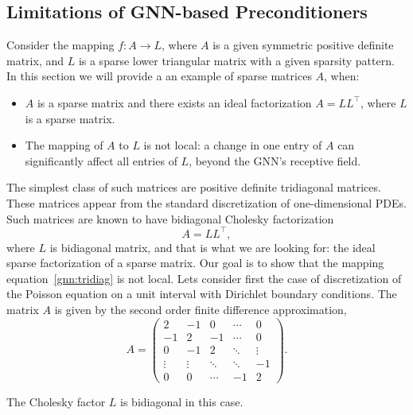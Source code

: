 \documentclass[10pt]{article} %
\def\eqref#1{equation~\ref{#1}}
\theoremstyle{plain}
\theoremstyle{definition}
\theoremstyle{remark}
\begin{document}
\subsection{Limitations of GNN-based Preconditioners}
Consider the mapping $f: A \rightarrow L$, where $A$ is a given symmetric positive definite matrix, and $L$ is a sparse lower triangular matrix with
a given sparsity pattern. In this section we will provide a an example of sparse matrices $A$, when: 
\begin{itemize}
\item $A$ is a sparse matrix and 
there exists an ideal factorization $A = L L^{\top}$, where $L$ is a sparse matrix.
\item The mapping of $A$ to $L$ is not local: a change in one entry of $A$ can significantly affect all entries of $L$, beyond the GNN's receptive field.
\end{itemize}
The simplest class of such matrices are positive definite tridiagonal matrices. These matrices appear from the standard discretization of 
one-dimensional PDEs. Such matrices are known to have bidiagonal Cholesky factorization 
\begin{equation}\label{gnn:tridiag}
   A = LL^{\top},
\end{equation}
where $L$ is bidiagonal matrix,
and that is what we are looking for: the ideal sparse factorization of a sparse matrix. Our goal is to show that the mapping \eqref{gnn:tridiag} is not local. Lets consider first the case of discretization of the Poisson equation 
on a unit interval with Dirichlet boundary conditions. The matrix $A$ is given by the second order finite difference approximation,
\begin{equation}
A = \begin{pmatrix}
2 & -1 & 0 & \cdots & 0 \\
-1 & 2 & -1 & \cdots & 0 \\
0 & -1 & 2 & \ddots & \vdots \\
\vdots & \vdots & \ddots & \ddots & -1 \\
0 & 0 & \cdots & -1 & 2
\end{pmatrix}.
\end{equation}

The Cholesky factor $L$ is bidiagonal in this case.
\end{document}
